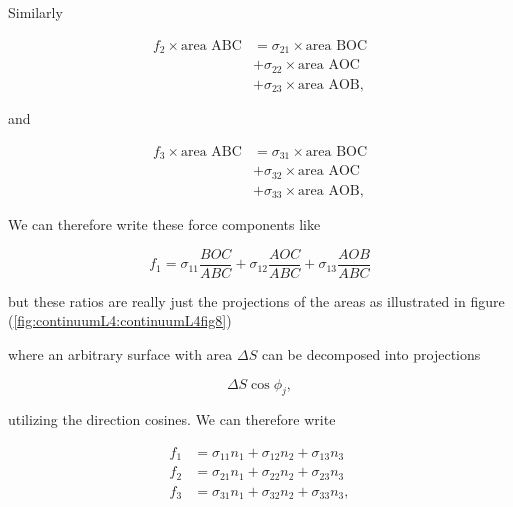 Similarly

\begin{equation}\label{eqn:continuumL4:270}
\begin{aligned}
f_2 \times \text{area ABC} 
&= 
\sigma_{21} \times \text{area BOC} \\
&+\sigma_{22} \times \text{area AOC} \\
&+\sigma_{23} \times \text{area AOB},
\end{aligned}
\end{equation}

and

\begin{equation}\label{eqn:continuumL4:290}
\begin{aligned}
f_3 \times \text{area ABC} 
&= 
\sigma_{31} \times \text{area BOC} \\
&+\sigma_{32} \times \text{area AOC} \\
&+\sigma_{33} \times \text{area AOB},
\end{aligned}
\end{equation}

We can therefore write these force components like

\begin{equation}\label{eqn:continuumL4:310}
f_1 = 
\sigma_{11} \frac{BOC}{ABC} + 
\sigma_{12} \frac{AOC}{ABC} + 
\sigma_{13} \frac{AOB}{ABC} 
\end{equation}

but these ratios are really just the projections of the areas as illustrated in figure (\ref{fig:continuumL4:continuumL4fig8})


where an arbitrary surface with area $\Delta S$ can be decomposed into projections

\begin{equation}\label{eqn:continuumL4:330}
\Delta S \cos\phi_j,
\end{equation}

utilizing the direction cosines.  We can therefore write

\begin{align}\label{eqn:continuumL4:350}
f_1 &= \sigma_{11} n_1 + \sigma_{12} n_2 + \sigma_{13} n_3 \\
f_2 &= \sigma_{21} n_1 + \sigma_{22} n_2 + \sigma_{23} n_3 \\
f_3 &= \sigma_{31} n_1 + \sigma_{32} n_2 + \sigma_{33} n_3,
\end{align}

